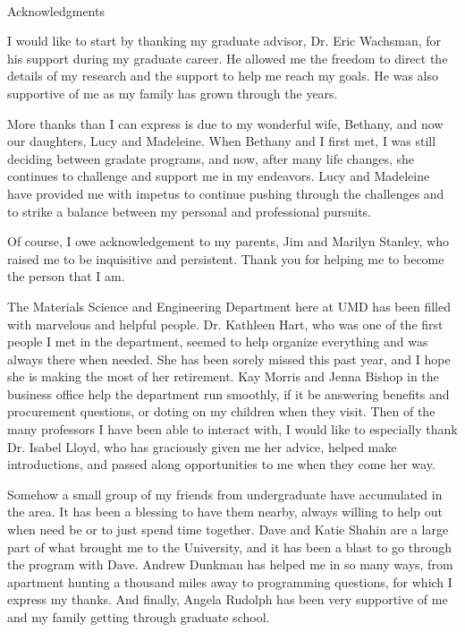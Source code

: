 

\renewcommand{\baselinestretch}{2}
\small\normalsize
\hbox{\ }

\vspace{-.65in}

\begin{center}
\large{Acknowledgments}
\end{center}

\vspace{1ex}

I would like to start by thanking my graduate advisor, Dr. Eric Wachsman, for his support during my graduate career.
He allowed me the freedom to direct the details of my research and the support to help me reach my goals.
He was also supportive of me as my family has grown through the years.

More thanks than I can express is due to my wonderful wife, Bethany, and now our daughters, Lucy and Madeleine.
When Bethany and I first met, I was still deciding between gradate programs, and now, after many life changes, she continues to challenge and support me in my endeavors.
Lucy and Madeleine have provided me with impetus to continue pushing through the challenges and to strike a balance between my personal and professional pursuits.

Of course, I owe acknowledgement to my parents, Jim and Marilyn Stanley, who raised me to be inquisitive and persistent.
Thank you for helping me to become the person that I am.

The Materials Science and Engineering Department here at UMD has been filled with marvelous and helpful people.
Dr. Kathleen Hart, who was one of the first people I met in the department, seemed to help organize everything and was always there when needed.
She has been sorely missed this past year, and I hope she is making the most of her retirement.
Kay Morris and Jenna Bishop in the business office help the department run smoothly, if it be answering benefits and procurement questions, or doting on my children when they visit.
Then of the many professors I have been able to interact with, I would like to especially thank Dr. Isabel Lloyd, who has graciously given me her advice, helped make introductions, and passed along opportunities to me when they come her way.

Somehow a small group of my friends from undergraduate have accumulated in the area.
It has been a blessing to have them nearby, always willing to help out when need be or to just spend time together.
Dave and Katie Shahin are a large part of what brought me to the University, and it has been a blast to go through the program with Dave.
Andrew Dunkman has helped me in so many ways, from apartment hunting a thousand miles away to programming questions, for which I express my thanks.
And finally, Angela Rudolph has been very supportive of me and my family getting through graduate school.

